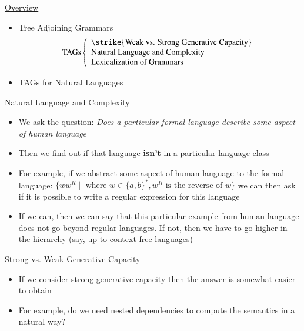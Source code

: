 \documentclass[landscape]{slides}
\begin{document}
\begin{slide}{\underline{Overview}}
\begin{itemize}
\item Tree Adjoining Grammars \[ \textrm{TAGs} \left\{ 
\begin{array}{l}
\textrm{\strike{Weak vs. Strong Generative Capacity}}\\
\textrm{Natural Language and Complexity}\\
\textrm{Lexicalization of Grammars}
\end{array}
\right. \]
\item TAGs for Natural Languages
\end{itemize}
\end{slide}

\begin{slide}{Natural Language and Complexity}
\begin{itemize}
\item We ask the question: {\em Does a particular formal language describe some aspect of human language}
\item Then we find out if that language {\bf isn't} in a particular
language class
\item For example, if we abstract some aspect of human language to the
formal language: $\{ w w^R \mid \textrm{ where } w \in \{a,b\}^\ast,
w^R \textrm{ is the reverse of } w \}$ we can then ask if it is
possible to write a regular expression for this language
\item If we can, then we can say that this particular example from
human language does not go beyond regular languages. If not, then we
have to go higher in the hierarchy (say, up to context-free languages)
\end{itemize}
\end{slide}

\begin{slide}{Strong vs. Weak Generative Capacity}
\begin{itemize}
\item If we consider strong generative capacity then the answer is
  somewhat easier to obtain 
\item For example, do we need nested dependencies to compute the
  semantics in a natural way?
\end{itemize}
\end{slide}
\end{document}

